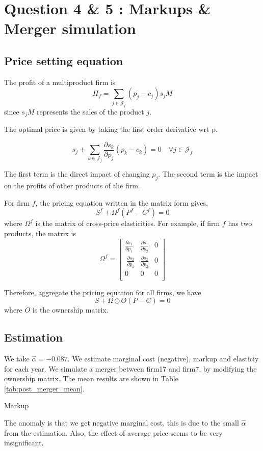\documentclass[12pt]{article}
\begin{document}
\section{Question 4 & 5 : Markups & Merger simulation}
\subsection{Price setting equation}
The profit of a multiproduct firm is $$ \Pi_f = \sum_{j\in \mathcal{J}_f} (p_j
    -c_j )s_jM$$ since $s_jM$ represents the sales of the product $j$.

The optimal price is given by taking the first order derivative wrt p.

$$ s_j+\sum_{k\in \mathcal{J}_f} \frac{\partial s_k}{\partial p_j} (p_k-c_k) = 0 \quad \forall j\in \mathcal{J}_f$$

The first term is the direct impact of changing $p_j$. The second term is the
impact on the profits of other products of the firm.

For firm $f$, the pricing equation written in the matrix form gives, $$ S^f +
    \Omega^f(P^f-C^f) = 0$$ where $\Omega^f$ is the matrix of cross-price
elasticities. For example, if firm $f$ has two products, the matrix is $$
    \Omega^f =\begin{bmatrix}
        \frac{\partial s_1}{\partial p_1} & \frac{\partial s_1}{\partial p_2} & 0 \\\ \frac{\partial s_2}{\partial p_1} &\frac{\partial s_2}{\partial p_2} & 0 \\0 & 0 &0\\
    \end{bmatrix}$$

Therefore, aggregate the pricing equation for all firms, we have $$ S + \Omega
    \odot O (P-C) = 0 $$ where $O$ is the ownership matrix.
\subsection{Estimation}
We take $\hat{\alpha}=-0.087$. We estimate marginal cost (negative), markup and
elasticiy for each year. We simulate a merger between firm17 and firm7, by
modifying the ownership matrix. The mean results are shown in Table
\ref{tab:post_merger_mean}.
\begin{table}[h!]\fontsize{10pt}{12pt}\selectfont
    \centering
    
    \caption{Markup}
    \label{tab:post_merger_mean}
\end{table} The anomaly is that we get
negative marginal cost, this is due to the small $\hat{\alpha}$ from the
estimation. Also, the effect of average price seems to be very insignificant.
\end{document}
